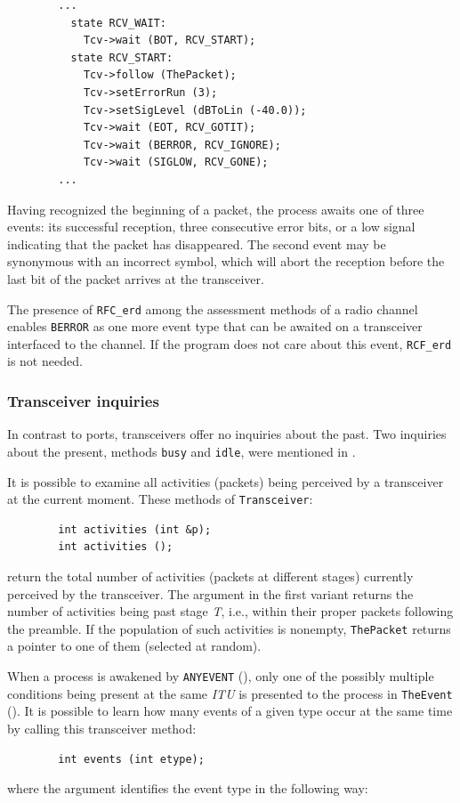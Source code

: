 \begin{verbatim}
        ...
          state RCV_WAIT:
            Tcv->wait (BOT, RCV_START);
          state RCV_START:
            Tcv->follow (ThePacket);
            Tcv->setErrorRun (3);
            Tcv->setSigLevel (dBToLin (-40.0));
            Tcv->wait (EOT, RCV_GOTIT);
            Tcv->wait (BERROR, RCV_IGNORE);
            Tcv->wait (SIGLOW, RCV_GONE);
        ...
\end{verbatim}

Having recognized the beginning of a packet, the process awaits one of three
events: its successful reception, three consecutive error bits, or a low
signal indicating that the packet has disappeared.
The second event may be synonymous with an incorrect symbol, which will
abort the reception before the last bit of the packet arrives at the
transceiver.

\medskip

The presence of {\tt RFC\_erd} among the assessment methods of a radio
channel enables {\tt BERROR} as one more event type that can be awaited on
a transceiver interfaced to the channel.
If the program does not care about this event, {\tt RCF\_erd} is not needed.

\subsubsection{Transceiver inquiries}
\label{rm_tr_pp_ti}

In contrast to ports, transceivers offer no inquiries about the past.
Two inquiries about the present, methods {\tt busy} and {\tt idle},
were mentioned in .

It is possible to examine all activities (packets)
being perceived by a transceiver at the current moment.
These methods of {\tt Transceiver}:
\begin{verbatim}
        int activities (int &p);
        int activities ();
\end{verbatim}
\noindent
return the total number of activities (packets at different stages) currently
perceived by the transceiver.
The argument in
the first variant returns the number of activities
being past stage {\em T}, i.e., within their proper packets following the
preamble.
If the population of such activities is nonempty,
{\tt ThePacket} returns a pointer to one of them (selected at random).

When a process is awakened by {\tt ANYEVENT} (),
only one of the possibly multiple conditions being present at the same
{\em ITU\/} is presented to the process in {\tt TheEvent} ().
It is possible to learn how many events of a given type
occur at the same time by calling this transceiver method:
\begin{verbatim}
        int events (int etype);
\end{verbatim}
\noindent
where the argument identifies the event type in the following way:

